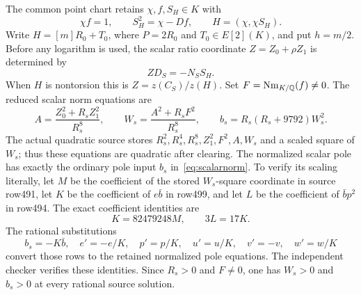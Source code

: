 \documentclass[11pt,a4paper]{article}
\newcommand{\Q}{\mathbb Q}\newcommand{\Z}{\mathbb Z}\newcommand{\HH}{\mathcal H}
\begin{document}
The common point chart retains $\chi,f,S_H\in K$ with
\begin{equation}\label{eq:Hchart}
                  \chi f=1,\qquad S_H^2=\chi-Df,
                  \qquad H=(\chi,\chi S_H).
\end{equation}
Write $H=[m]R_0+T_0$, where $P=2R_0$ and $T_0\in E[2](K)$,
and put $h=m/2$. Before any logarithm is used, the scalar ratio
coordinate $Z=Z_0+\rho Z_1$ is determined by
\[
                         ZD_S=-N_SS_H.
\]
When $H$ is nontorsion this is $Z=z(C_S)/z(H)$.
Set $F=\Nm_{K/\Q}(f)\ne0$. The reduced scalar norm equations are
\begin{equation}\label{eq:scalarnorm}
 A=\frac{Z_0^2+R_sZ_1^2}{R_s^8},\qquad
 W_s=\frac{A^2+R_sF^2}{R_s^8},\qquad
 b_s=R_s(R_s+9792)W_s^2.
\end{equation}
The actual quadratic source stores $R_s^2,R_s^4,R_s^8,Z_1^2,F^2,A,W_s$
and a scaled square of $W_s$; thus these equations are quadratic after
clearing. The normalized scalar pole has exactly the ordinary pole
input $b_s$ in~\eqref{eq:scalarnorm}. To verify its scaling literally,
let $M$ be the coefficient of the stored $W_s$-square coordinate in
source row491, let $K$ be the coefficient of $e\bar b$ in row499,
and let $L$ be the coefficient of $\bar b p^2$ in row494. The exact
coefficient identities are
\[
                  K=82479248M,\qquad 3L=17K.
\]
The rational substitutions
\[
 b_s=-K\bar b,\quad e'=-e/K,\quad p'=p/K,\quad
 u'=u/K,\quad v'=-v,\quad w'=w/K
\]
convert those rows to the retained normalized pole equations. The
independent checker verifies these identities. Since $R_s>0$ and
$F\ne0$, one has $W_s>0$ and $b_s>0$ at every rational source solution.
\end{document}
